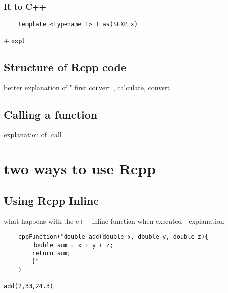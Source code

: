 \documentclass{article}
\begin{document}
        \subsubsection{R to C++}
        \begin{verbatim}
    template <typename T> T as(SEXP x)
        \end{verbatim} 
        + expl
    \subsection{Structure of Rcpp code}
        better explanation of " first convert , calculate, convert
    \subsection{Calling a function}
        explanation of .call
\section{ two ways to use Rcpp}

    \subsection{Using Rcpp Inline}

    what happens with the c++ inline function when executed - explanation
        \begin{verbatim}
    cppFunction("double add(double x, double y, double z){
        double sum = x + y + z;
        return sum;
        }"
    )

add(2,33,24.3)        \end{verbatim}
\end{document}

